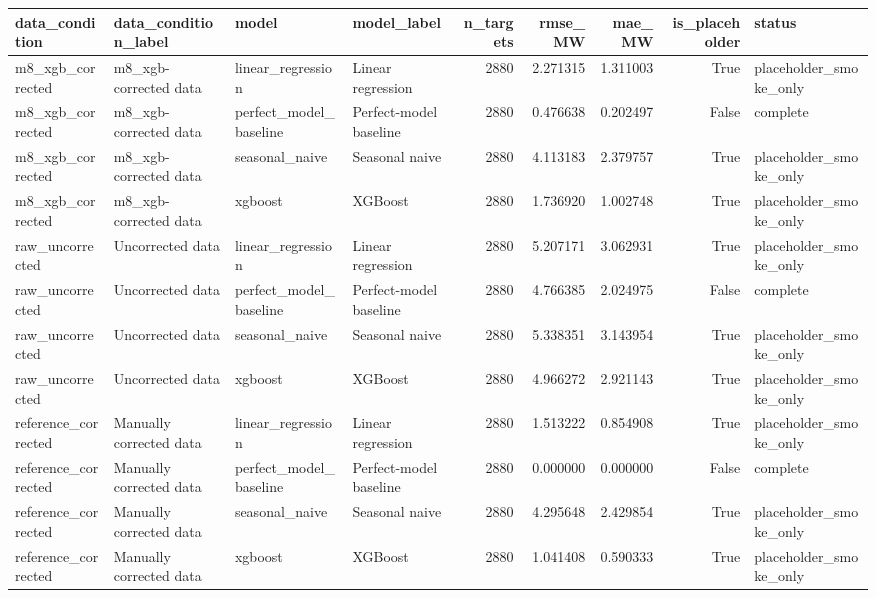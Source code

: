 \begin{tabular}{llllrrrrl}
\toprule
data_condition & data_condition_label & model & model_label & n_targets & rmse_MW & mae_MW & is_placeholder & status \\
\midrule
m8_xgb_corrected & m8_xgb-corrected data & linear_regression & Linear regression & 2880 & 2.271315 & 1.311003 & True & placeholder_smoke_only \\
m8_xgb_corrected & m8_xgb-corrected data & perfect_model_baseline & Perfect-model baseline & 2880 & 0.476638 & 0.202497 & False & complete \\
m8_xgb_corrected & m8_xgb-corrected data & seasonal_naive & Seasonal naive & 2880 & 4.113183 & 2.379757 & True & placeholder_smoke_only \\
m8_xgb_corrected & m8_xgb-corrected data & xgboost & XGBoost & 2880 & 1.736920 & 1.002748 & True & placeholder_smoke_only \\
raw_uncorrected & Uncorrected data & linear_regression & Linear regression & 2880 & 5.207171 & 3.062931 & True & placeholder_smoke_only \\
raw_uncorrected & Uncorrected data & perfect_model_baseline & Perfect-model baseline & 2880 & 4.766385 & 2.024975 & False & complete \\
raw_uncorrected & Uncorrected data & seasonal_naive & Seasonal naive & 2880 & 5.338351 & 3.143954 & True & placeholder_smoke_only \\
raw_uncorrected & Uncorrected data & xgboost & XGBoost & 2880 & 4.966272 & 2.921143 & True & placeholder_smoke_only \\
reference_corrected & Manually corrected data & linear_regression & Linear regression & 2880 & 1.513222 & 0.854908 & True & placeholder_smoke_only \\
reference_corrected & Manually corrected data & perfect_model_baseline & Perfect-model baseline & 2880 & 0.000000 & 0.000000 & False & complete \\
reference_corrected & Manually corrected data & seasonal_naive & Seasonal naive & 2880 & 4.295648 & 2.429854 & True & placeholder_smoke_only \\
reference_corrected & Manually corrected data & xgboost & XGBoost & 2880 & 1.041408 & 0.590333 & True & placeholder_smoke_only \\
\bottomrule
\end{tabular}
